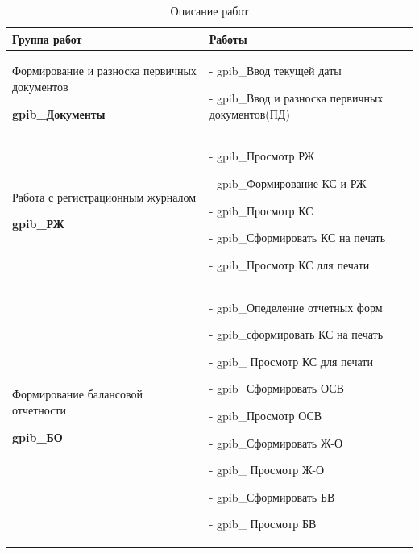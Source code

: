 \begin{table}[!htb]
    \centering
    \scriptsize
    \caption{Описание работ}
    \begin{tabular}{|p{8cm}|p{8cm}|} 


\hline


\textbf{Группа работ}
&
\textbf{Работы}
\\ \hline


Формирование и разноска первичных документов \par
\hspace{0pt} \par
\textbf{gpib\_Документы}
&
- gpib\_Ввод текущей даты \par
- gpib\_Ввод и разноска первичных документов(ПД)
\\ \hline


Работа с регистрационным журналом \par
\hspace{0pt} \par
\textbf{gpib\_РЖ}
&
- gpib\_Просмотр РЖ \par
- gpib\_Формирование КС и РЖ \par
- gpib\_Просмотр КС \par
- gpib\_Сформировать КС на печать \par
- gpib\_Просмотр КС для печати
\\ \hline


Формирование балансовой отчетности \par
\hspace{0pt} \par
\textbf{gpib\_БО}
&
- gpib\_Опеделение отчетных форм \par
- gpib\_сформировать КС на печать \par
- gpib\_ Просмотр КС для печати \par
- gpib\_Сформировать ОСВ \par
- gpib\_Просмотр ОСВ \par
- gpib\_Сформировать Ж-О \par
- gpib\_ Просмотр Ж-О \par
- gpib\_Сформировать БВ \par
- gpib\_ Просмотр БВ
\\ \hline


\end{tabular}
\end{table}
